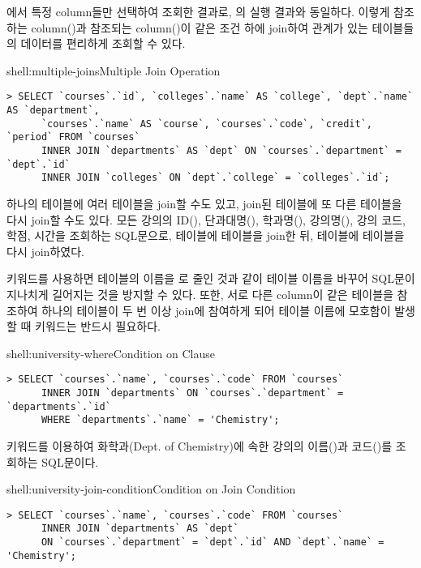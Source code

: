 \는 에서 특정 column들만 선택하여 조회한 결과로, 의 실행 결과와 동일하다. 이렇게 참조하는 column()과 참조되는 column()이 같은 조건 하에 join하여 관계가 있는 테이블들의 데이터를 편리하게 조회할 수 있다.
\newpage

\begin{shellenv}{shell:multiple-joins}{Multiple Join Operation}
\begin{verbatim}
> SELECT `courses`.`id`, `colleges`.`name` AS `college`, `dept`.`name` AS `department`,
      `courses`.`name` AS `course`, `courses`.`code`, `credit`, `period` FROM `courses`
      INNER JOIN `departments` AS `dept` ON `courses`.`department` = `dept`.`id`
      INNER JOIN `colleges` ON `dept`.`college` = `colleges`.`id`;
\end{verbatim}
\end{shellenv}

하나의 테이블에 여러 테이블을 join할 수도 있고, join된 테이블에 또 다른 테이블을 다시 join할 수도 있다. \는 모든 강의의 ID(), 단과대명(), 학과명(), 강의명(), 강의 코드, 학점, 시간을 조회하는 SQL문으로,  테이블에  테이블을 join한 뒤,  테이블에  테이블을 다시 join하였다.

 키워드를 사용하면  테이블의 이름을 로 줄인 것과 같이 테이블 이름을 바꾸어 SQL문이 지나치게 길어지는 것을 방지할 수 있다. 또한, 서로 다른 column이 같은 테이블을 참조하여 하나의 테이블이 두 번 이상 join에 참여하게 되어 테이블 이름에 모호함이 발생할 때  키워드는 반드시 필요하다.

\begin{shellenv}{shell:university-where}{Condition on  Clause}\begin{verbatim}
> SELECT `courses`.`name`, `courses`.`code` FROM `courses`
      INNER JOIN `departments` ON `courses`.`department` = `departments`.`id`
      WHERE `departments`.`name` = 'Chemistry';
\end{verbatim}
\end{shellenv}

\는  키워드를 이용하여 화학과(Dept. of Chemistry)에 속한 강의의 이름()과 코드()를 조회하는 SQL문이다.

\begin{shellenv}{shell:university-join-condition}{Condition on Join Condition}\begin{verbatim}
> SELECT `courses`.`name`, `courses`.`code` FROM `courses`
      INNER JOIN `departments` AS `dept`
      ON `courses`.`department` = `dept`.`id` AND `dept`.`name` = 'Chemistry';
\end{verbatim}
\end{shellenv}


